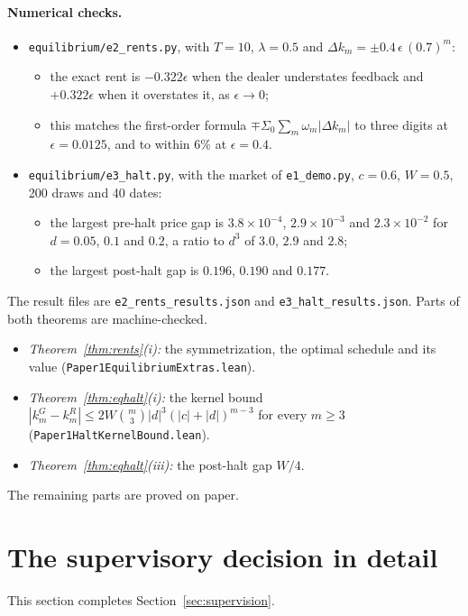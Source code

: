 \documentclass[12pt]{article}
\theoremstyle{definition}
\theoremstyle{remark}
\begin{document}
\paragraph{Numerical checks.}
\begin{itemize}[itemsep=1pt,topsep=2pt]
\item \nolinkurl{equilibrium/e2_rents.py}, with $T=10$, $\lambda=0.5$ and $\Delta k_m=\pm0.4\,\epsilon\,(0.7)^m$:
  \begin{itemize}[itemsep=1pt,topsep=1pt]
  \item the exact rent is $-0.322\epsilon$ when the dealer understates feedback and $+0.322\epsilon$ when it overstates it, as $\epsilon\to0$;
  \item this matches the first-order formula $\mp\Sigma_0\sum_m\omega_m|\Delta k_m|$ to three digits at $\epsilon=0.0125$, and to within 6\% at $\epsilon=0.4$.
  \end{itemize}
\item \nolinkurl{equilibrium/e3_halt.py}, with the market of \nolinkurl{e1_demo.py}, $c=0.6$, $W=0.5$, 200 draws and 40 dates:
  \begin{itemize}[itemsep=1pt,topsep=1pt]
  \item the largest pre-halt price gap is $3.8\times10^{-4}$, $2.9\times10^{-3}$ and $2.3\times10^{-2}$ for $d=0.05$, $0.1$ and $0.2$, a ratio to $d^3$ of $3.0$, $2.9$ and $2.8$;
  \item the largest post-halt gap is $0.196$, $0.190$ and $0.177$.
  \end{itemize}
\end{itemize}
The result files are \nolinkurl{e2_rents_results.json} and \nolinkurl{e3_halt_results.json}. Parts of both theorems are machine-checked.
\begin{itemize}[itemsep=1pt,topsep=2pt]
\item \emph{Theorem~\ref{thm:rents}(i):} the symmetrization, the optimal schedule and its value (\nolinkurl{Paper1EquilibriumExtras.lean}).
\item \emph{Theorem~\ref{thm:eqhalt}(i):} the kernel bound $|k^G_m-k^R_m|\le2W\binom m3|d|^3(|c|+|d|)^{m-3}$ for every $m\ge3$ (\nolinkurl{Paper1HaltKernelBound.lean}).
\item \emph{Theorem~\ref{thm:eqhalt}(iii):} the post-halt gap $W/4$.
\end{itemize}
The remaining parts are proved on paper.



\section{The supervisory decision in detail}\label{app:decisionfull}
This section completes Section~\ref{sec:supervision}.
\end{document}
